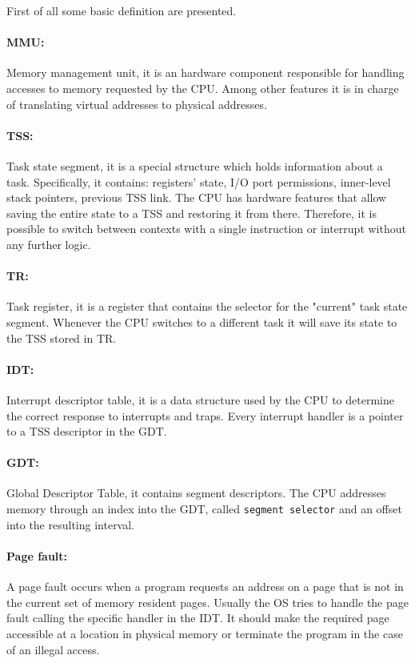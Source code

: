 \documentclass[11pt,twoside,a4paper]{article}
\begin{document}
First of all some basic definition are presented.

\paragraph{MMU: } Memory management unit, it is an hardware component responsible for handling accesses to memory requested by the CPU. Among other features it is in charge of translating virtual addresses to physical addresses.

\paragraph{TSS: } Task state segment, it is a special structure which holds information about a task. Specifically, it contains: registers' state, I/O port permissions, inner-level stack pointers, previous TSS link. The CPU has hardware features that allow saving the entire state to a TSS and restoring it from there. Therefore, it is possible to switch between contexts with a single instruction or interrupt without any further logic.

\paragraph{TR: } Task register, it is a register that contains the selector for the "current" task state segment. Whenever the CPU switches to a different task it will save its state to the TSS stored in TR.

\paragraph{IDT: } Interrupt descriptor table, it is a data structure used by the CPU to determine the correct response to interrupts and traps. Every interrupt handler is a pointer to a TSS descriptor in the GDT.

\paragraph{GDT: } Global Descriptor Table, it contains segment descriptors. The CPU addresses memory through an index into the GDT, called \texttt{segment selector} and an offset into the resulting interval.

\paragraph{Page fault: } A page fault occurs when a program requests an address on a page that is not in the current set of memory resident pages. Usually the OS tries to handle the page fault calling the specific handler in the IDT. It should make the required page accessible at a location in physical memory or terminate the program in the case of an illegal access.
\end{document}
